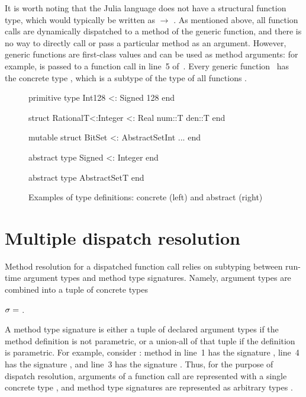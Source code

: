 It is worth noting that the Julia language does not have a structural function type,
which would typically be written as  $\rightarrow$ . As mentioned above,
all function calls are dynamically dispatched to a method of the generic
function, and there is no way to directly call or
pass a particular method as an argument.
However, generic functions are first-class values and can be used as
method arguments: for example, \cjl{(-)} is passed to a function call in line~5
of~.
Every generic function~ has the concrete type ,
which is a subtype of the type of all functions .

\begin{figure}[t] 
\begin{minipage}{6cm}
\begin{julia}
primitive type Int128 <: Signed 128
end

struct Rational{T<:Integer} <: Real
  num::T
  den::T
end

mutable struct
  BitSet <: AbstractSet{Int}
  ...
end
\end{julia}
\end{minipage}
\hspace{1.2cm}
\begin{minipage}{5.5cm}
\begin{julia}
abstract type Signed <: Integer
end

abstract type AbstractSet{T}
end
\end{julia}
\end{minipage}
\caption{Examples of type definitions:
  concrete (left) and abstract (right)}\label{fig:code:user-def-types}
\end{figure}


\section{Multiple dispatch resolution}\label{sec:2:dispatch}

Method resolution for a dispatched function call 
relies on subtyping between run-time argument types and method type signatures.
Namely, argument types are combined into a tuple of concrete types
\begin{center}
  $\sigma =$ .
\end{center}
A method type signature is either a tuple of declared argument types
if the method definition is not parametric, or a union-all of that tuple
if the definition is parametric.
For example, consider : method in line~1
has the signature , line~4 has the signature
, and line~3 has the signature
.
Thus, for the purpose of dispatch resolution, arguments of a function call
are represented with a single concrete type \gty,
and method type signatures are represented as arbitrary types \ty.

